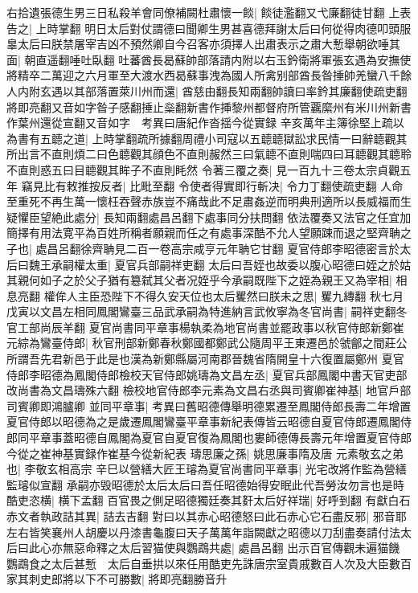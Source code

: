 右拾遺張德生男三日私殺羊會同僚補闕杜肅懷一餤|{
	餤徒濫翻又弋廉翻徒甘翻}
上表告之|{
	上時掌翻}
明日太后對仗謂德曰聞卿生男甚喜德拜謝太后曰何從得肉德叩頭服辠太后曰朕禁屠宰吉凶不預然卿自今召客亦須擇人出肅表示之肅大慙舉朝欲唾其面|{
	朝直遥翻唾吐臥翻}
吐蕃酋長曷蘇帥部落請内附以右玉鈐衛將軍張玄遇為安撫使將精卒二萬迎之六月軍至大渡水西曷蘇事洩為國人所禽别部酋長昝捶帥羌蠻八千餘人内附玄遇以其部落置萊川州而還|{
	酋慈由翻長知兩翻帥讀曰率鈐其廉翻使疏吏翻將即亮翻又音如字昝子感翻捶止橤翻新書作挿黎州都督府所管覊縻州有米川州新書作葉州還從宣翻又音如字　考異曰唐紀作沓揺今從實録}
辛亥萬年主簿徐堅上疏以為書有五聼之道|{
	上時掌翻疏所據翻周禮小司寇以五聼聼獄訟求民情一曰辭聼觀其所出言不直則煩二曰色聼觀其顔色不直則赧然三曰氣聼不直則喘四曰耳聼觀其聼聆不直則惑五曰目聼觀其眸子不直則眊然}
令著三覆之奏|{
	見一百九十三卷太宗貞觀五年}
竊見比有敕推按反者|{
	比毗至翻}
令使者得實即行斬决|{
	令力丁翻使疏吏翻}
人命至重死不再生萬一懷枉吞聲赤族豈不痛哉此不足肅姦逆而明典刑適所以長威福而生疑懼臣望絶此處分|{
	長知兩翻處昌呂翻下處事同分扶問翻}
依法覆奏又法官之任宜加簡擇有用法寛平為百姓所稱者願親而任之有處事深酷不允人望願踈而退之堅齊聃之子也|{
	處昌呂翻徐齊聃見二百一卷高宗咸亨元年聃它甘翻}
夏官侍郎李昭德密言於太后曰魏王承嗣權太重|{
	夏官兵部嗣祥吏翻}
太后曰吾姪也故委以腹心昭德曰姪之於姑其親何如子之於父子猶有簒弑其父者况姪乎今承嗣既陛下之姪為親王又為宰相|{
	相息亮翻}
權侔人主臣恐陛下不得久安天位也太后矍然曰朕未之思|{
	矍九縳翻}
秋七月戊寅以文昌左相同鳳閣鸞臺三品武承嗣為特進納言武攸寧為冬官尚書|{
	嗣祥吏翻冬官工部尚辰羊翻}
夏官尚書同平章事楊執柔為地官尚書並罷政事以秋官侍郎新鄭崔元綜為鸞臺侍郎|{
	秋官刑部新鄭春秋鄭國都鄭武公隨周平王東遷邑於虢鄶之間莊公所謂吾先君新邑于此是也漢為新鄭縣屬河南郡晉魏省隋開皇十六復置屬鄭州}
夏官侍郎李昭德為鳳閣侍郎檢校天官侍郎姚璹為文昌左丞|{
	夏官兵部鳳閣中書天官吏部改尚書為文昌璹殊六翻}
檢校地官侍郎李元素為文昌右丞與司賓卿崔神基|{
	地官戶部司賓卿即鴻臚卿}
並同平章事|{
	考異曰舊昭德傳舉明德累遷至鳳閣侍郎長壽二年增置夏官侍郎以昭德為之是歲遷鳳閣鸞臺平章事新紀表傳皆云昭德自夏官侍郎遷鳳閣侍郎同平章事蓋昭德自鳳閣為夏官自夏官復為鳳閣也婁師德傳長壽元年增置夏官侍郎今從之崔神基實録作崔基今從新紀表}
璹思廉之孫|{
	姚思廉事隋及唐}
元素敬玄之弟也|{
	李敬玄相高宗}
辛巳以營繕大匠王璿為夏官尚書同平章事|{
	光宅改將作監為營繕監璿似宣翻}
承嗣亦毁昭德於太后太后曰吾任昭德始得安眠此代吾勞汝勿言也是時酷吏恣横|{
	横下孟翻}
百官畏之側足昭德獨廷奏其姧太后好祥瑞|{
	好呼到翻}
有獻白石赤文者執政詰其異|{
	詰去吉翻}
對曰以其赤心昭德怒曰此石赤心它石盡反邪|{
	邪音耶}
左右皆笑襄州人胡慶以丹漆書龜腹曰天子萬萬年詣闕獻之昭德以刀刮盡奏請付法太后曰此心亦無惡命釋之太后習猫使與鸚鵡共處|{
	處昌呂翻}
出示百官傳觀未遍猫饑鸚鵡食之太后甚慙　太后自垂拱以來任用酷吏先誅唐宗室貴戚數百人次及大臣數百家其刺史郎將以下不可勝數|{
	將即亮翻勝音升}
